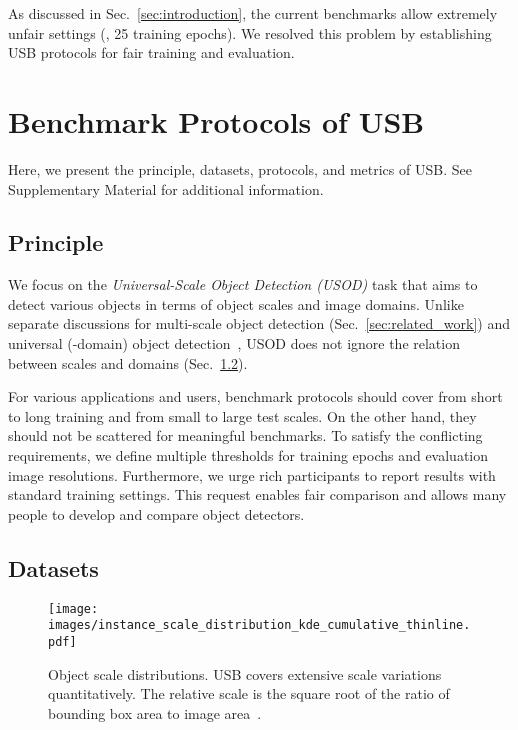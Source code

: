 \documentclass[10pt,twocolumn,letterpaper]{article}
\def\AppendixSection{Supplementary Material\xspace}
\begin{document}
As discussed in Sec.~\ref{sec:introduction},
the current benchmarks allow extremely unfair settings (\eg, 25 training epochs).
We resolved this problem by establishing USB protocols for fair training and evaluation.










\section{Benchmark Protocols of USB}
\label{sec:usb}

Here, we present the principle, datasets, protocols, and metrics of USB.
See \AppendixSection for additional information.


\subsection{Principle}

We focus on the \textit{Universal-Scale Object Detection (USOD)} task
that aims to detect various objects in terms of object scales and image domains.
Unlike separate discussions for multi-scale object detection (Sec.~\ref{sec:related_work}) and universal (-domain) object detection~\cite{UniversalObjectDetection_CVPR2019},
USOD does not ignore the relation between scales and domains (Sec.~\ref{sec:usb_datasets}).


For various applications and users, benchmark protocols should cover 
from short to long training and from small to large test scales.
On the other hand, they should not be scattered for meaningful benchmarks.
To satisfy the conflicting requirements, we define multiple thresholds for training epochs and evaluation image resolutions.
Furthermore, we urge rich participants to report results with standard training settings.
This request enables fair comparison and allows many people to develop and compare object detectors.


\subsection{Datasets}
\label{sec:usb_datasets}

\begin{figure}[t]
	\centering
	\begin{minipage}[c]{0.41\linewidth}
		\texttt{[image: images/instance\_scale\_distribution\_kde\_cumulative\_thinline.pdf]}
	\end{minipage}\hfill
	\begin{minipage}[c]{0.575\linewidth}
		\caption{
			Object scale distributions.
			USB covers extensive scale variations quantitatively.
			The relative scale is the square root of the ratio of bounding box area to image area~\cite{TinyPerson_WACV2020, SNIP_Singh_CVPR2018, Waymo2d_1st_2020}.
		}
		\label{fig:instance_scale_distribution}
	\end{minipage}
\end{figure}
\end{document}
